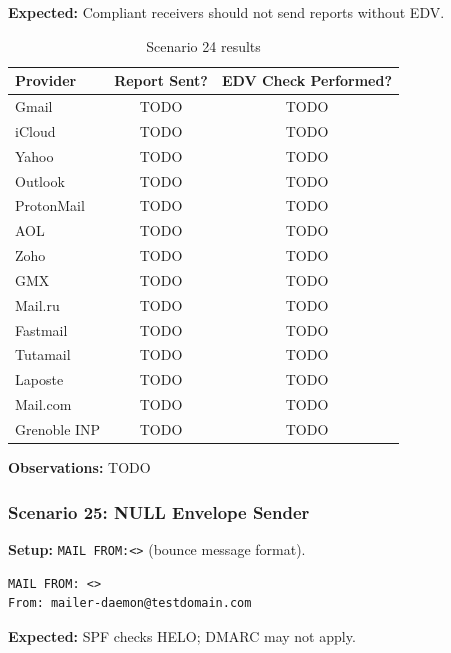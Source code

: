 \documentclass[11pt,a4paper]{article}
\begin{document}
\textbf{Expected:} Compliant receivers should not send reports without EDV.

\begin{table}[h]
\centering
\small
\begin{tabular}{lcc}
\toprule
\textbf{Provider} & \textbf{Report Sent?} & \textbf{EDV Check Performed?} \\
\midrule
Gmail & TODO & TODO \\
iCloud & TODO & TODO \\
Yahoo & TODO & TODO \\
Outlook & TODO & TODO \\
ProtonMail & TODO & TODO \\
AOL & TODO & TODO \\
Zoho & TODO & TODO \\
GMX & TODO & TODO \\
Mail.ru & TODO & TODO \\
Fastmail & TODO & TODO \\
Tutamail & TODO & TODO \\
Laposte & TODO & TODO \\
Mail.com & TODO & TODO \\
Grenoble INP & TODO & TODO \\
\bottomrule
\end{tabular}
\caption{Scenario 24 results}
\end{table}

\textbf{Observations:} TODO


\subsubsection{Scenario 25: NULL Envelope Sender}

\textbf{Setup:} \texttt{MAIL FROM:<>} (bounce message format).

\begin{lstlisting}
MAIL FROM: <>
From: mailer-daemon@testdomain.com
\end{lstlisting}

\textbf{Expected:} SPF checks HELO; DMARC may not apply.
\end{document}
